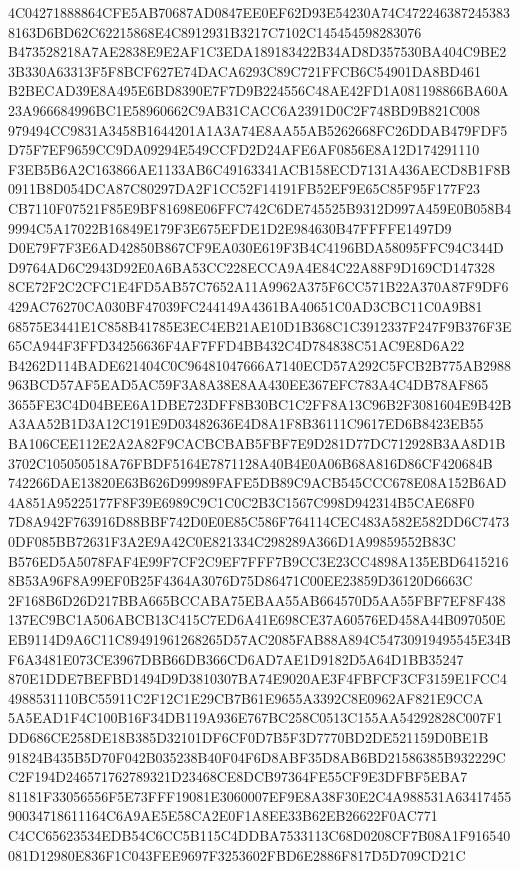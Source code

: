 \documentclass[UTF8,fontset=fandol,zihao=-4,a4paper]{ctexart}
\begin{document}
{{4C04271888864CFE5AB70687AD0847EE0EF62D93E54230A74C4722463872453838163D6BD62C62215868E4C8912931B3217C7102C145454598283076
B473528218A7AE2838E9E2AF1C3EDA189183422B34AD8D357530BA404C9BE23B330A63313F5F8BCF627E74DACA6293C89C721FFCB6C54901DA8BD461
B2BECAD39E8A495E6BD8390E7F7D9B224556C48AE42FD1A081198866BA60A23A966684996BC1E58960662C9AB31CACC6A2391D0C2F748BD9B821C008
979494CC9831A3458B1644201A1A3A74E8AA55AB5262668FC26DDAB479FDF5D75F7EF9659CC9DA09294E549CCFD2D24AFE6AF0856E8A12D174291110
F3EB5B6A2C163866AE1133AB6C49163341ACB158ECD7131A436AECD8B1F8B0911B8D054DCA87C80297DA2F1CC52F14191FB52EF9E65C85F95F177F23
CB7110F07521F85E9BF81698E06FFC742C6DE745525B9312D997A459E0B058B49994C5A17022B16849E179F3E675EFDE1D2E984630B47FFFFE1497D9
D0E79F7F3E6AD42850B867CF9EA030E619F3B4C4196BDA58095FFC94C344DD9764AD6C2943D92E0A6BA53CC228ECCA9A4E84C22A88F9D169CD147328
8CE72F2C2CFC1E4FD5AB57C7652A11A9962A375F6CC571B22A370A87F9DF6429AC76270CA030BF47039FC244149A4361BA40651C0AD3CBC11C0A9B81
68575E3441E1C858B41785E3EC4EB21AE10D1B368C1C3912337F247F9B376F3E65CA944F3FFD34256636F4AF7FFD4BB432C4D784838C51AC9E8D6A22
B4262D114BADE621404C0C96481047666A7140ECD57A292C5FCB2B775AB2988963BCD57AF5EAD5AC59F3A8A38E8AA430EE367EFC783A4C4DB78AF865
3655FE3C4D04BEE6A1DBE723DFF8B30BC1C2FF8A13C96B2F3081604E9B42BA3AA52B1D3A12C191E9D03482636E4D8A1F8B36111C9617ED6B8423EB55
BA106CEE112E2A2A82F9CACBCBAB5FBF7E9D281D77DC712928B3AA8D1B3702C105050518A76FBDF5164E7871128A40B4E0A06B68A816D86CF420684B
742266DAE13820E63B626D99989FAFE5DB89C9ACB545CCC678E08A152B6AD4A851A95225177F8F39E6989C9C1C0C2B3C1567C998D942314B5CAE68F0
7D8A942F763916D88BBF742D0E0E85C586F764114CEC483A582E582DD6C74730DF085BB72631F3A2E9A42C0E821334C298289A366D1A99859552B83C
B576ED5A5078FAF4E99F7CF2C9EF7FFF7B9CC3E23CC4898A135EBD64152168B53A96F8A99EF0B25F4364A3076D75D86471C00EE23859D36120D6663C
2F168B6D26D217BBA665BCCABA75EBAA55AB664570D5AA55FBF7EF8F438137EC9BC1A506ABCB13C415C7ED6A41E698CE37A60576ED458A44B097050E
EB9114D9A6C11C89491961268265D57AC2085FAB88A894C54730919495545E34BF6A3481E073CE3967DBB66DB366CD6AD7AE1D9182D5A64D1BB35247
870E1DDE7BEFBD1494D9D3810307BA74E9020AE3F4FBFCF3CF3159E1FCC44988531110BC55911C2F12C1E29CB7B61E9655A3392C8E0962AF821E9CCA
5A5EAD1F4C100B16F34DB119A936E767BC258C0513C155AA54292828C007F1DD686CE258DE18B385D32101DF6CF0D7B5F3D7770BD2DE521159D0BE1B
91824B435B5D70F042B035238B40F04F6D8ABF35D8AB6BD21586385B932229CC2F194D246571762789321D23468CE8DCB97364FE55CF9E3DFBF5EBA7
81181F33056556F5E73FFF19081E3060007EF9E8A38F30E2C4A988531A6341745590034718611164C6A9AE5E58CA2E0F1A8EE33B62EB26622F0AC771
C4CC65623534EDB54C6CC5B115C4DDBA7533113C68D0208CF7B08A1F916540081D12980E836F1C043FEE9697F3253602FBD6E2886F817D5D709CD21C
}}
\end{document}
